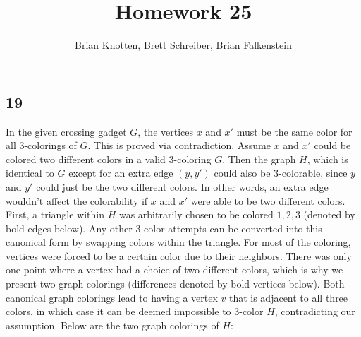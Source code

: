 \documentclass[letterpaper,notitlepage,twoside]{article}
\begin{document}
\title{Homework 25}
\author{Brian Knotten, Brett Schreiber, Brian Falkenstein}
\maketitle
\subsection*{19}
In the given crossing gadget $G$, the vertices $x$ and $x'$ must be the same color for all 3-colorings of $G$. This is proved via contradiction. Assume $x$ and $x'$ could be colored two different colors in a valid 3-coloring $G$. Then the graph $H$, which is identical to $G$ except for an extra edge $(y, y')$ could also be 3-colorable, since $y$ and $y'$ could just be the two different colors. In other words, an extra edge wouldn't affect the colorability if $x$ and $x'$ were able to be two different colors.
\\
First, a triangle within $H$ was arbitrarily chosen to be colored $1, 2, 3$ (denoted by bold edges below). Any other 3-color attempts can be converted into this canonical form by swapping colors within the triangle. For most of the coloring, vertices were forced to be a certain color due to their neighbors. There was only one point where a vertex had a choice of two different colors, which is why we present two graph colorings (differences denoted by bold vertices below). Both canonical graph colorings lead to having a vertex $v$ that is adjacent to all three colors, in which case it can be deemed impossible to 3-color $H$, contradicting our assumption. Below are the two graph colorings of $H$:
\\\\
\end{document}
